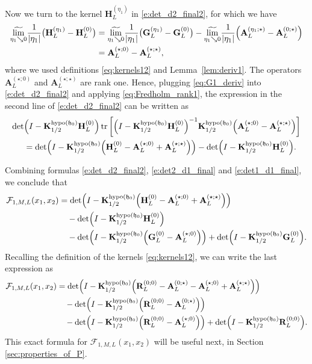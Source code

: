 \documentclass[oneside,final,11pt]{amsart}
\theoremstyle{definition}
\newcommand{\fh}{\mathfrak{h}}
\newcommand{\mylim}[1]{\underset{#1}{\wt{\mathrm{lim}}}}
\newcommand{\dens}{\CF}
\newcommand{\1}[1]{\mathbf{1}_{#1}}
\newcommand{\wt}{\widetilde}
\newcommand{\kmtext}[1]{{\color{red}[KM:#1]}}
\newcommand{\uptext}[1]{\text{\upshape{#1}}}
\DeclareMathOperator{\hypo}{\uptext{hypo}}
\DeclareMathOperator{\tr}{\mathop{\uptext{tr}}}
\newcommand{\fA}{\mathbf{A}}
\newcommand{\fK}{\mathbf{K}}
\newcommand{\fR}{\mathbf{R}}
\newcommand{\fG}{\mathbf{G}}
\newcommand{\fH}{\mathbf{H}}
\newcommand{\CF}{\mathcal{F}}
\numberwithin{equation}{section}
\begin{document}
Now we turn to the kernel $\fH_L^{(\eta_1)}$ in \eqref{e:det_d2_final2}, for which we have
\begin{align}
\mylim{\eta_1 \searrow 0} \frac{1}{|\eta_1|} \bigl( \fH_L^{(\eta_1)} - \fH_L^{(0)}\bigr) 
&= \mylim{\eta_1 \searrow 0} \frac{1}{|\eta_1|} \bigl( \fG_L^{(\eta_1)} - \fG_L^{(0)}\bigr) - \mylim{\eta_1 \searrow 0} \frac{1}{|\eta_1|} \Bigl( \fA_L^{(\eta_1; \star)} - \fA_L^{(0; \star)}\Bigr)\\
&= \fA_L^{(\star; 0)} - \fA_L^{(\star; \star)},
\label{eq:G1_deriv}
\end{align}
where we used definitions \eqref{eq:kernels12} and Lemma~\ref{lem:deriv1}. The operators $\fA_L^{(\star; 0)}$ and $\fA_L^{(\star; \star)}$ are rank one. Hence, plugging \eqref{eq:G1_deriv} into \eqref{e:det_d2_final2} and applying \eqref{eq:Fredholm_rank1}, the expression in the second line of \eqref{e:det_d2_final2} can be written as
\begin{align}
\det&\Big(I-\fK^{\hypo(\fh_0)}_{1/2} \fH_L^{(0)}\Bigr) \tr\bigg[\Bigl(I-\fK^{\hypo(\fh_0)}_{1/2} \fH_L^{(0)}\Bigr)^{-1} \fK^{\hypo(\fh_0)}_{1/2} \Bigl(\fA_L^{(\star; 0)} - \fA_L^{(\star; \star)}\Bigr)\bigg]\\
&= \det\Bigl(I- \fK^{\hypo(\fh_0)}_{1/2} \Bigl(\fH_L^{(0)} - \fA_L^{(\star; 0)} + \fA_L^{(\star; \star)}\Bigr) \Bigr) - \det\Bigl(I- \fK^{\hypo(\fh_0)}_{1/2} \fH_L^{(0)} \Bigr). \label{e:det1_d1_final}
\end{align}

Combining formulas \eqref{e:det_d2_final2}, \eqref{e:det2_d1_final} and \eqref{e:det1_d1_final}, we conclude that
\begin{align}
\dens_{1, M, L}(x_1, x_2) &= \det\Bigl(I- \fK^{\hypo(\fh_0)}_{1/2} \Bigl(\fH_L^{(0)} - \fA_L^{(\star; 0)} + \fA_L^{(\star; \star)}\Bigr) \Bigr) \\
&\quad - \det\Bigl(I- \fK^{\hypo(\fh_0)}_{1/2} \fH_L^{(0)} \Bigr) \\
&\quad- \det \Bigl(I- \fK^{\hypo(\fh_0)}_{1/2} \Bigl(\fG_L^{(0)} - \fA_L^{(\star; 0)}\Bigr) \Bigr) + \det \Bigl(I-\fK^{\hypo(\fh_0)}_{1/2}\fG_L^{(0)}\Bigr).
\end{align}
Recalling the definition of the kernels \eqref{eq:kernels12}, we can write the last expression as %
\begin{equation}
\begin{split}
\dens_{1, M, L}(x_1, x_2) &= \det\Bigl(I- \fK^{\hypo(\fh_0)}_{1/2} \Bigl(\fR_L^{(0; 0)} - \fA_L^{(0; \star)} - \fA_L^{(\star; 0)} + \fA_L^{(\star; \star)}\Bigr) \Bigr) \\
&\quad - \det\Bigl(I- \fK^{\hypo(\fh_0)}_{1/2} \Bigl(\fR_L^{(0; 0)} - \fA_L^{(0; \star)}\Bigr) \Bigr)\\
&\quad - \det \Bigl(I- \fK^{\hypo(\fh_0)}_{1/2} \Bigl(\fR_L^{(0; 0)} - \fA_L^{(\star; 0)}\Bigr) \Bigr) + \det \Bigl(I-\fK^{\hypo(\fh_0)}_{1/2}\fR_L^{(0; 0)}\Bigr).
\end{split}
\label{e:final}
\end{equation}
This exact formula for $\dens_{1, M, L}(x_1, x_2)$ will be useful next, in Section \ref{sec:properties_of_P}.
\end{document}
